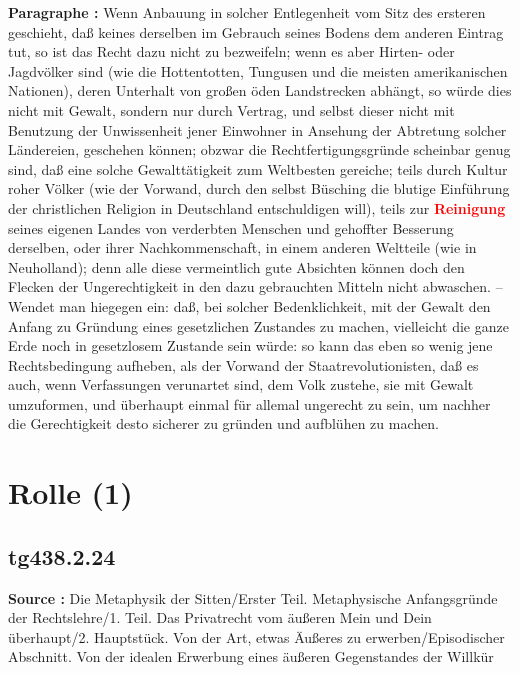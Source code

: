 \documentclass[a4paper,12pt,twoside]{book}
\newcommand{\match}[1]{\textcolor{red}{\textbf{#1}}}
\newcommand{\unnumberedsection}[1]{
	\section*{#1}
	\addcontentsline{toc}{section}{#1}
	\markright{#1}
}
\begin{document}
	\textbf{Paragraphe : }Wenn Anbauung in solcher Entlegenheit vom Sitz des ersteren geschieht, daß keines derselben im Gebrauch seines Bodens dem anderen Eintrag tut, so ist das Recht dazu nicht zu bezweifeln; wenn es aber Hirten- oder Jagdvölker  sind (wie die Hottentotten, Tungusen und die meisten amerikanischen Nationen), deren Unterhalt von großen öden Landstrecken abhängt, so würde dies nicht mit Gewalt, sondern nur durch Vertrag, und selbst dieser nicht mit Benutzung der Unwissenheit jener Einwohner in Ansehung der Abtretung solcher Ländereien, geschehen können; obzwar die Rechtfertigungsgründe scheinbar genug sind, daß eine solche Gewalttätigkeit zum Weltbesten gereiche; teils durch Kultur roher Völker (wie der Vorwand, durch den selbst Büsching die blutige Einführung der christlichen Religion in Deutschland entschuldigen will), teils zur \match{Reinigung} seines eigenen Landes von verderbten Menschen und gehoffter Besserung derselben, oder ihrer Nachkommenschaft, in einem anderen Weltteile (wie in Neuholland); denn alle diese vermeintlich gute Absichten können doch den Flecken der Ungerechtigkeit in den dazu gebrauchten Mitteln nicht abwaschen. – Wendet man hiegegen ein: daß, bei solcher Bedenklichkeit, mit der Gewalt den Anfang zu Gründung eines gesetzlichen Zustandes zu machen, vielleicht die ganze Erde noch in gesetzlosem Zustande sein würde: so kann das eben so wenig jene Rechtsbedingung aufheben, als der Vorwand der Staatrevolutionisten, daß es auch, wenn Verfassungen verunartet sind, dem Volk zustehe, sie mit Gewalt umzuformen, und überhaupt einmal für allemal ungerecht zu sein, um nachher die Gerechtigkeit desto sicherer zu gründen und aufblühen zu machen. 
	
	\unnumberedsection{Rolle (1)} 
	\subsection*{tg438.2.24} 
	\textbf{Source : }Die Metaphysik der Sitten/Erster Teil. Metaphysische Anfangsgründe der Rechtslehre/1. Teil. Das Privatrecht vom äußeren Mein und Dein überhaupt/2. Hauptstück. Von der Art, etwas Äußeres zu erwerben/Episodischer Abschnitt. Von der idealen Erwerbung eines äußeren Gegenstandes der Willkür\\  
	
\end{document}
